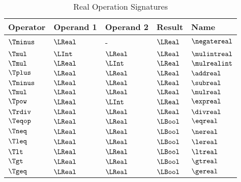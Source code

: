 \begin{table}[!htbp]
\caption{Real Operation Signatures\label{ta:RealOperators}}
\centering
\hypertarget{def-mulintreal}{}
\hypertarget{def-mulrealint}{}
\hypertarget{def-negatereal}{}
\hypertarget{def-addreal}{}
\hypertarget{def-subreal}{}
\hypertarget{def-mulreal}{}
\hypertarget{def-expreal}{}
\hypertarget{def-divreal}{}
\hypertarget{def-eqreal}{}
\hypertarget{def-nereal}{}
\hypertarget{def-lereal}{}
\hypertarget{def-ltreal}{}
\hypertarget{def-gtreal}{}
\hypertarget{def-gereal}{}
\begin{tabular}{lllll}
\hline
\textbf{Operator} & \textbf{Operand 1} & \textbf{Operand 2} & \textbf{Result} & \textbf{Name}\\
\hline
$\Tminus$ & $\LReal$ & - & $\LReal$ & $\negatereal$\\
$\Tmul$   & $\LInt$  & $\LReal$ & $\LReal$ & $\mulintreal$\\
$\Tmul$   & $\LReal$ & $\LInt$  & $\LReal$ & $\mulrealint$\\
$\Tplus$  & $\LReal$ & $\LReal$ & $\LReal$ & $\addreal$\\
$\Tminus$ & $\LReal$ & $\LReal$ & $\LReal$ & $\subreal$\\
$\Tmul$   & $\LReal$ & $\LReal$ & $\LReal$ & $\mulreal$\\
$\Tpow$   & $\LReal$ & $\LInt$  & $\LReal$ & $\expreal$\\
$\Trdiv$  & $\LReal$ & $\LReal$ & $\LReal$ & $\divreal$\\
$\Teqop$  & $\LReal$ & $\LReal$ & $\LBool$ & $\eqreal$\\
$\Tneq$   & $\LReal$ & $\LReal$ & $\LBool$ & $\nereal$\\
$\Tleq$   & $\LReal$ & $\LReal$ & $\LBool$ & $\lereal$\\
$\Tlt$    & $\LReal$ & $\LReal$ & $\LBool$ & $\ltreal$\\
$\Tgt$    & $\LReal$ & $\LReal$ & $\LBool$ & $\gtreal$\\
$\Tgeq$   & $\LReal$ & $\LReal$ & $\LBool$ & $\gereal$\\
\hline
\end{tabular}
\end{table}

